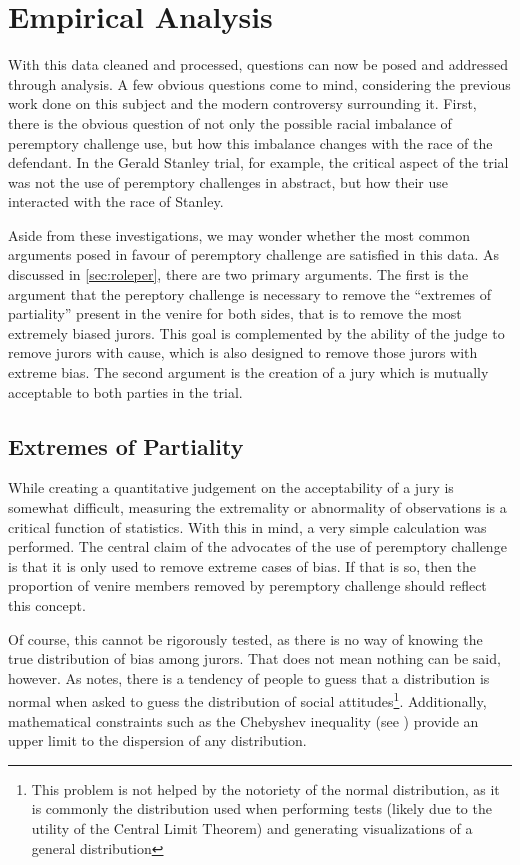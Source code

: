 \chapter{Empirical Analysis} \label{c:analysis}

With this data cleaned and processed, questions can now be posed and addressed through analysis. A few obvious questions come to
mind, considering the previous work done on this subject and the modern controversy surrounding it. First, there is the obvious
question of not only the possible racial imbalance of peremptory challenge use, but how this imbalance changes with the race of
the defendant. In the Gerald Stanley trial, for example, the critical aspect of the trial was not the use of peremptory challenges
in abstract, but how their use interacted with the race of Stanley.

Aside from these investigations, we may wonder whether the most common arguments posed in favour of peremptory challenge are
satisfied in this data. As discussed in \ref{sec:roleper}, there are two primary arguments. The first is the argument that the
pereptory challenge is necessary to remove the ``extremes of partiality'' present in the venire for both sides, that is to remove
the most extremely biased jurors. This goal is complemented by the ability of the judge to remove jurors with cause, which is also
designed to remove those jurors with extreme bias. The second argument is the creation of a jury which is mutually acceptable to
both parties in the trial.

\section{Extremes of Partiality} \label{sec:extremes}

While creating a quantitative judgement on the acceptability of a jury is somewhat difficult, measuring the extremality or
abnormality of observations is a critical function of statistics. With this in mind, a very simple calculation was performed. The
central claim of the advocates of the use of peremptory challenge is that it is only used to remove extreme cases of bias. If that
is so, then the proportion of venire members removed by peremptory challenge should reflect this concept.

Of course, this cannot be rigorously tested, as there is no way of knowing the true distribution of bias among jurors. That does
not mean nothing can be said, however. As \cite{nisbett1985} notes, there is a tendency of people to guess that a distribution is
normal when asked to guess the distribution of social attitudes\footnote{This problem is not helped by the notoriety of the normal
  distribution, as it is commonly the distribution used when performing tests (likely due to the utility of the Central Limit
  Theorem) and generating visualizations of a general distribution}. Additionally, mathematical constraints such as the Chebyshev
inequality (see \cite{chebyshev}) provide an upper limit to the dispersion of any distribution.

